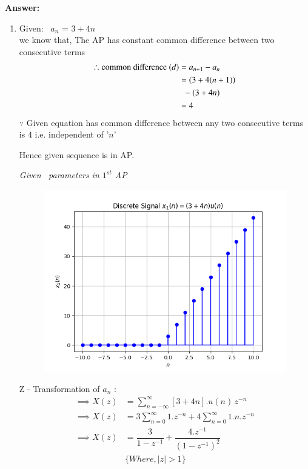 \documentclass[journal,12pt,twocolumn]{IEEEtran}
\theoremstyle{remark}
\begin{document}
\vspace{0.5cm}
\textbf{Answer:} 
\begin{enumerate} [label=(\roman*)]
    \item Given: $\,$ $a_n$ = $3 + 4n$ \\
    we know that, The AP has constant common difference between two consecutive terms
    \begin{align}
        \therefore \text{common difference } (d) &= a_{n+1} - a_n \\
        &= \left(3+4(n+1)\right) \nonumber\\
        & \,\,\, -\left(3+4n\right) \nonumber\\
        &= 4
    \end{align}
   $\because$ Given equation has common difference between any two consecutive terms is $4$ i.e. independent of '$n$'
   \begin{center}
       Hence given sequence is in AP.
   \end{center}
   \vspace{0.3cm}

    \begin{table}[htbp] 
    \centering
    
    \vspace{0.2cm}
    \caption{\normalsize\textsl{Given \, parameters in $1^{st}$ AP}}
    \label{given parameters list}
    \end{table}

    \begin{figure}[!h] 
    \centering
    \includegraphics[width=\columnwidth]{figs/signal_x1.png}
    \caption{}
    \label{fig:Graph1}
    \end{figure}
     Z - Transformation of $a_n$ :
    \begin{align}
        \implies  X(z) &= \sum_{n = -\infty}^{\infty}[3 + 4n].u(n) \, z^{-n} \\
        \implies X(z) &= 3 \sum_{n = 0}^{\infty} 1.z^{-n} + 4 \sum_{n = 0}^{\infty} 1.n.z^{-n} \\
        \implies X(z) &= \dfrac{3}{1-z^{-1}} + \dfrac{4.z^{-1}}{(1-z^{-1})^2}\\
        &\{ Where, |z|>1\} \nonumber
    \end{align}
    

\end{enumerate}
\end{document}
